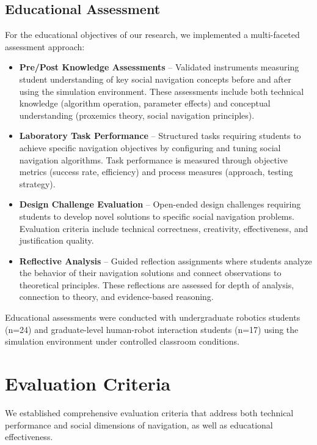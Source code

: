 \subsection{Educational Assessment}
\label{subsec:educational_assessment}
For the educational objectives of our research, we implemented a multi-faceted assessment 
approach:
\begin{itemize}
    \item \textbf{Pre/Post Knowledge Assessments} -- Validated instruments measuring student 
    understanding of key social navigation concepts before and after using the simulation 
    environment. These assessments include both technical knowledge (algorithm operation, 
    parameter effects) and conceptual understanding (proxemics theory, social navigation principles).
    \item \textbf{Laboratory Task Performance} -- Structured tasks requiring students to 
    achieve specific navigation objectives by configuring and tuning social navigation 
    algorithms. Task performance is measured through objective metrics (success rate, efficiency) 
    and process measures (approach, testing strategy).
    \item \textbf{Design Challenge Evaluation} -- Open-ended design challenges requiring 
    students to develop novel solutions to specific social navigation problems. Evaluation 
    criteria include technical correctness, creativity, effectiveness, and justification quality.
    \item \textbf{Reflective Analysis} -- Guided reflection assignments where students 
    analyze the behavior of their navigation solutions and connect observations to 
    theoretical principles. These reflections are assessed for depth of analysis, 
    connection to theory, and evidence-based reasoning.
\end{itemize}
Educational assessments were conducted with undergraduate robotics students (n=24) and 
graduate-level human-robot interaction students (n=17) using the simulation environment 
under controlled classroom conditions.




\section{Evaluation Criteria}
\label{sec:evaluation_criteria}
We established comprehensive evaluation criteria that address both technical performance 
and social dimensions of navigation, as well as educational effectiveness.

